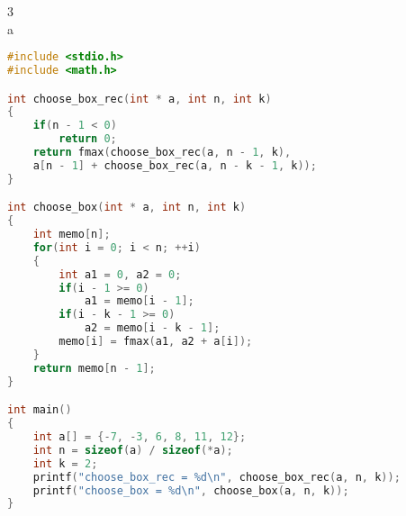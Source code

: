 \documentclass[12pt,border=4pt,multi]{article} %
\begin{document}
\leavevmode
\\
\\
\\
\\
\\
3\\
a
\begin{lstlisting}[language = c]
#include <stdio.h>
#include <math.h>

int choose_box_rec(int * a, int n, int k)
{
    if(n - 1 < 0)
        return 0;
    return fmax(choose_box_rec(a, n - 1, k), 
    a[n - 1] + choose_box_rec(a, n - k - 1, k));
}

int choose_box(int * a, int n, int k)
{
    int memo[n];
    for(int i = 0; i < n; ++i)
    {
        int a1 = 0, a2 = 0;
        if(i - 1 >= 0)
            a1 = memo[i - 1];
        if(i - k - 1 >= 0)
            a2 = memo[i - k - 1];
        memo[i] = fmax(a1, a2 + a[i]);   
    }
    return memo[n - 1];
}

int main()
{
    int a[] = {-7, -3, 6, 8, 11, 12};
    int n = sizeof(a) / sizeof(*a);
    int k = 2;
    printf("choose_box_rec = %d\n", choose_box_rec(a, n, k));
    printf("choose_box = %d\n", choose_box(a, n, k));
}
\end{lstlisting}
\end{document}
